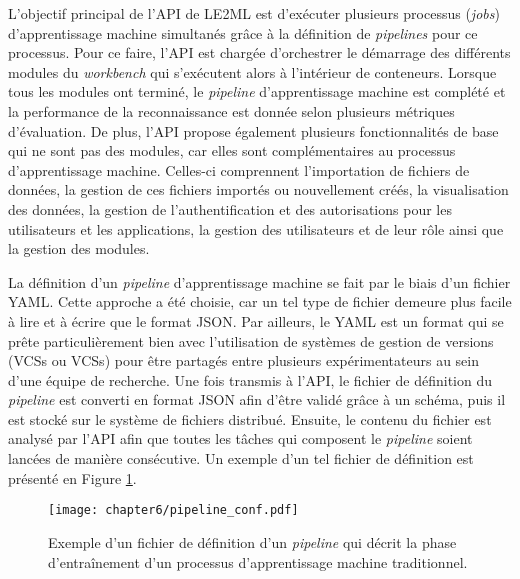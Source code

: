 L'objectif principal de l'\acs{API} de \acs{LE2ML} est d'exécuter plusieurs processus (\emph{jobs}) d'apprentissage machine simultanés grâce à la définition de \textit{pipelines} pour ce processus. Pour ce faire, l'\acs{API} est chargée d'orchestrer le démarrage des différents modules du \textit{workbench} qui s'exécutent alors à l'intérieur de conteneurs. Lorsque tous les modules ont terminé, le \textit{pipeline} d'apprentissage machine est complété et la performance de la reconnaissance est donnée selon plusieurs métriques d'évaluation. De plus, l'\acs{API} propose également plusieurs fonctionnalités de base qui ne sont pas des modules, car elles sont complémentaires au processus d'apprentissage machine. Celles-ci comprennent l'importation de fichiers de données, la gestion de ces fichiers importés ou nouvellement créés, la visualisation des données, la gestion de l'authentification et des autorisations pour les utilisateurs et les applications, la gestion des utilisateurs et de leur rôle ainsi que la gestion des modules.

La définition d'un \textit{pipeline} d'apprentissage machine se fait par le biais d'un fichier \ac{YAML}. Cette approche a été choisie, car un tel type de fichier demeure plus facile à lire et à écrire que le format \acs{JSON}. Par ailleurs, le \acs{YAML} est un format qui se prête particulièrement bien avec l'utilisation de systèmes de gestion de versions (\aclp{VCS} ou \acsp{VCS}) pour être partagés entre plusieurs expérimentateurs au sein d'une équipe de recherche. Une fois transmis à l'\acs{API}, le fichier de définition du \textit{pipeline} est converti en format JSON afin d'être validé grâce à un schéma, puis il est stocké sur le système de fichiers distribué. Ensuite, le contenu du fichier est analysé par l'\acs{API} afin que toutes les tâches qui composent le \textit{pipeline} soient lancées de manière consécutive. Un exemple d'un tel fichier de définition est présenté en Figure \ref{fig:pipeline_conf}.

\begin{figure}[H]
	\centering
	\texttt{[image: chapter6/pipeline\_conf.pdf]}
        \caption{Exemple d'un fichier de définition d'un \textit{pipeline} qui décrit la phase d'entraînement d'un processus d'apprentissage machine traditionnel.}
	\label{fig:pipeline_conf}
\end{figure}

